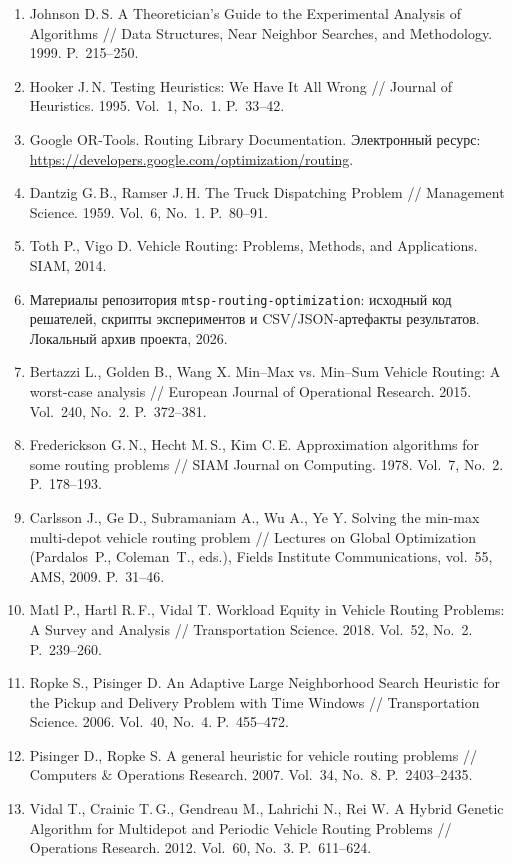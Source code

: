 \documentclass[14pt,a4paper]{extarticle}
\begin{document}
\begin{enumerate}
  \item Johnson D.\,S. A Theoretician's Guide to the Experimental Analysis of Algorithms // Data Structures, Near Neighbor Searches, and Methodology. 1999. P.~215--250.
  \item Hooker J.\,N. Testing Heuristics: We Have It All Wrong // Journal of Heuristics. 1995. Vol.~1, No.~1. P.~33--42.
  \item Google OR-Tools. Routing Library Documentation. Электронный ресурс: \url{https://developers.google.com/optimization/routing}.
  \item Dantzig G.\,B., Ramser J.\,H. The Truck Dispatching Problem // Management Science. 1959. Vol.~6, No.~1. P.~80--91.
  \item Toth P., Vigo D. Vehicle Routing: Problems, Methods, and Applications. SIAM, 2014.
  \item Материалы репозитория \texttt{mtsp-routing-optimization}: исходный код решателей, скрипты экспериментов и CSV/JSON-артефакты результатов. Локальный архив проекта, 2026.
  \item Bertazzi L., Golden B., Wang X. Min--Max vs. Min--Sum Vehicle Routing: A worst-case analysis // European Journal of Operational Research. 2015. Vol.~240, No.~2. P.~372--381.
  \item Frederickson G.\,N., Hecht M.\,S., Kim C.\,E. Approximation algorithms for some routing problems // SIAM Journal on Computing. 1978. Vol.~7, No.~2. P.~178--193.
  \item Carlsson J., Ge D., Subramaniam A., Wu A., Ye Y. Solving the min-max multi-depot vehicle routing problem // Lectures on Global Optimization (Pardalos~P., Coleman~T., eds.), Fields Institute Communications, vol.~55, AMS, 2009. P.~31--46.
  \item Matl P., Hartl R.\,F., Vidal T. Workload Equity in Vehicle Routing Problems: A Survey and Analysis // Transportation Science. 2018. Vol.~52, No.~2. P.~239--260.
  \item Ropke S., Pisinger D. An Adaptive Large Neighborhood Search Heuristic for the Pickup and Delivery Problem with Time Windows // Transportation Science. 2006. Vol.~40, No.~4. P.~455--472.
  \item Pisinger D., Ropke S. A general heuristic for vehicle routing problems // Computers \& Operations Research. 2007. Vol.~34, No.~8. P.~2403--2435.
  \item Vidal T., Crainic T.\,G., Gendreau M., Lahrichi N., Rei W. A Hybrid Genetic Algorithm for Multidepot and Periodic Vehicle Routing Problems // Operations Research. 2012. Vol.~60, No.~3. P.~611--624.

\end{enumerate}
\end{document}
